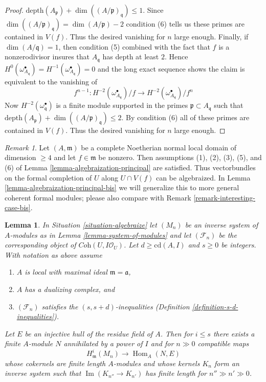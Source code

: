 \documentclass{stacks-project}
\theoremstyle{plain}
\newtheorem{lemma}[subsection]{Lemma}
\theoremstyle{definition}
\theoremstyle{remark}
\newtheorem{remark}[subsection]{Remark}
\numberwithin{equation}{subsection}
\def\Hom{\mathop{\mathrm{Hom}}\nolimits}
\def\Im{\mathop{\mathrm{Im}}}
\begin{document}
\begin{proof}
$\text{depth}(A_\mathfrak p) + \dim((A/\mathfrak p)_\mathfrak q) \leq 1$.
Since $\dim((A/\mathfrak p)_\mathfrak q) = \dim(A/\mathfrak p) - 2$
condition (6) tells us these primes are contained in $V(f)$.
Thus the desired vanishing for $n$ large enough.
Finally, if $\dim(A/\mathfrak q) = 1$, then condition (5) combined
with the fact that $f$ is a nonzerodivisor
insures that $A_\mathfrak q$ has depth at least $2$. Hence
$H^0(\omega_{A_\mathfrak q}^\bullet) =
H^{-1}(\omega_{A_\mathfrak q}^\bullet) = 0$
and the long exact sequence shows the claim is
equivalent to the vanishing of
$$
f^{n - 1} :
H^{-2}(\omega_{A_\mathfrak q}^\bullet)/f \to
H^{-2}(\omega_{A_\mathfrak q}^\bullet)/f^n
$$
Now $H^{-2}(\omega^\bullet_\mathfrak q)$ is a finite
module supported in the primes $\mathfrak p \subset A_\mathfrak q$
such that $\text{depth}(A_\mathfrak p) + \dim((A/\mathfrak p)_\mathfrak q)
\leq 2$. By condition (6) all of these primes are contained in $V(f)$.
Thus the desired vanishing for $n$ large enough.
\end{proof}

\begin{remark}
\label{remark-interesting-case}
Let $(A, \mathfrak m)$ be a complete Noetherian normal local domain
of dimension $\geq 4$ and let $f \in \mathfrak m$ be nonzero.
Then assumptions (1), (2), (3), (5), and (6) of
Lemma \ref{lemma-algebraization-principal}
are satisfied. Thus vectorbundles
on the formal completion of $U$ along $U \cap V(f)$
can be algebraized. In Lemma \ref{lemma-algebraization-principal-bis}
we will generalize this to more general coherent formal modules;
please also compare with Remark \ref{remark-interesting-case-bis}.
\end{remark}

\begin{lemma}
\label{lemma-helper-algebraize}
In Situation \ref{situation-algebraize} let $(M_n)$ be an inverse system of
$A$-modules as in Lemma \ref{lemma-system-of-modules} and let
$(\mathcal{F}_n)$ be the corresponding object of
$\textit{Coh}(U, I\mathcal{O}_U)$. Let $d \geq \text{cd}(A, I)$
and $s \geq 0$ be integers.
With notation as above assume
\begin{enumerate}
\item $A$ is local with maximal ideal $\mathfrak m = \mathfrak a$,
\item $A$ has a dualizing complex, and
\item $(\mathcal{F}_n)$ satisfies the $(s, s + d)$-inequalities
(Definition \ref{definition-s-d-inequalities}).
\end{enumerate}
Let $E$ be an injective hull of the residue field of $A$. Then for $i \leq s$
there exists a finite $A$-module $N$ annihilated by a power
of $I$ and for $n \gg 0$ compatible maps
$$
H^i_\mathfrak m(M_n) \to \Hom_A(N, E)
$$
whose cokernels are finite length $A$-modules and whose kernels $K_n$
form an inverse system such that $\Im(K_{n''} \to K_{n'})$ has finite
length for $n'' \gg n' \gg 0$.
\end{lemma}
\end{document}
